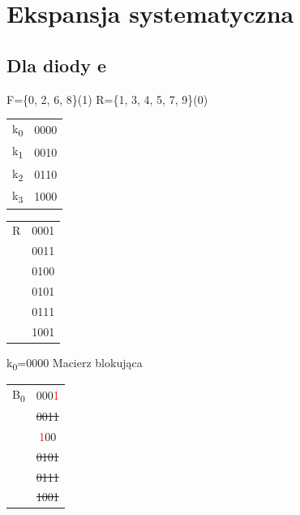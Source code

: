 \documentclass[]{article}
\begin{document}
\section{Ekspansja systematyczna}
\subsection{Dla diody e}
F=\{0, 2, 6, 8\}(1)   R=\{1, 3, 4, 5, 7, 9\}(0)
\newline
\newline
\begin{minipage}{0.5\textwidth}
\centering
\begin{tabular}{|c|c|}
\hline
k\textsubscript{0} & 0000 \\
k\textsubscript{1} & 0010 \\
k\textsubscript{2} & 0110 \\
k\textsubscript{3} & 1000 \\
\hline
\end{tabular}
\end{minipage}
\hfill
\begin{minipage}{0.5\textwidth}
\centering
\begin{tabular}[r]{|c|c|}
\hline
    R & 0001 \\
      & 0011 \\
      & 0100 \\
      & 0101 \\
      & 0111 \\
      & 1001 \\
\hline 
\end{tabular}
\end{minipage}
\newline
\newline
\newline
k\textsubscript{0}=0000
\newline
Macierz blokująca
\newline
\begin{tabular}[r]{|c|c|}
\hline
    B\textsubscript{0} & 000\textcolor{red}{1} \\
      & \sout{0011} \\
      & \textcolor{red}{1}00 \\
      & \sout{0101} \\
      & \sout{0111} \\
      & \sout{1001} \\
 \hline 
\end{tabular}
\newline
\newline
\end{document}
